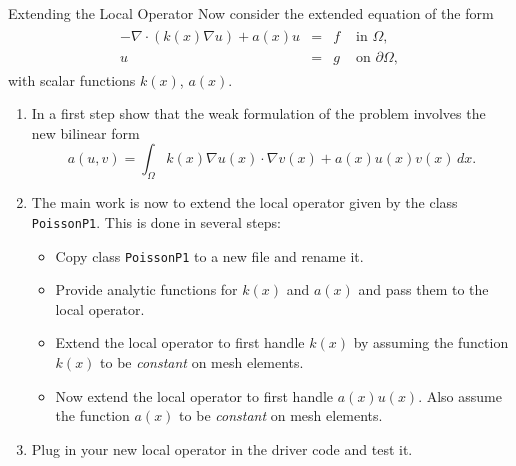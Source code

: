 \documentclass[12pt,a4paper]{article}
\begin{document}
\begin{Exercise}{Extending the Local Operator}
Now consider the extended equation of the form
\begin{align}
    \begin{array}{rcll}
      -\nabla\cdot (k(x) \nabla u) +a(x) u  & = & f & \text{ in } \Omega, \\
      u & = & g & \text{ on } \partial\Omega,
    \end{array}
\end{align}
with scalar functions $k(x)$, $a(x)$.

\begin{enumerate}
\item In a first step show that the weak formulation of the problem involves
the new bilinear form $$a(u,v) = \int_\Omega k(x) \nabla u(x) \cdot \nabla v(x) + a(x) u(x) v(x) \,dx .$$
\item The main work is now to extend the local operator given by the class
\lstinline{PoissonP1}. This is done in several steps:
\begin{itemize}
\item Copy class \lstinline{PoissonP1} to a new file and rename it.
\item Provide analytic functions for $k(x)$ and $a(x)$ and pass them
to the local operator.
\item Extend the local operator to first handle $k(x)$ by assuming the function $k(x)$
to be \emph{constant} on mesh elements.
\item Now extend the local operator to first handle $a(x) u(x)$. Also assume the function
$a(x)$ to be \emph{constant} on mesh elements.
\end{itemize}
\item Plug in your new local operator in the driver code and test it.
\end{enumerate}
\end{Exercise}
\end{document}
